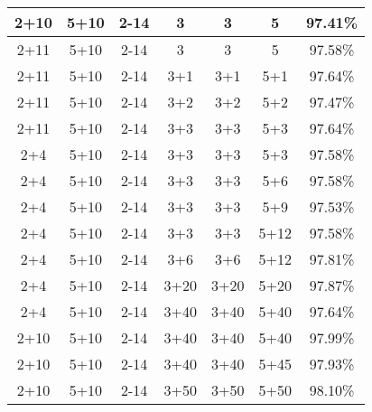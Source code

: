 \documentclass[12pt,a4paper]{extarticle}
\begin{document}
\begin{center}
\begin{tabular}{| c | c | c | c | c | c || c |}
  2+10 & 5+10 & 2-14 & 3 & 3 & 5 & 97.41\% \\ \hline
  2+11 & 5+10 & 2-14 & 3 & 3 & 5 & 97.58\% \\ \hline
  2+11 & 5+10 & 2-14 & 3+1 & 3+1 & 5+1 & 97.64\% \\ \hline
  2+11 & 5+10 & 2-14 & 3+2 & 3+2 & 5+2 & 97.47\% \\ \hline
  2+11 & 5+10 & 2-14 & 3+3 & 3+3 & 5+3 & 97.64\% \\ \hline
  2+4 & 5+10 & 2-14 & 3+3 & 3+3 & 5+3 & 97.58\% \\ \hline
  2+4 & 5+10 & 2-14 & 3+3 & 3+3 & 5+6 & 97.58\% \\ \hline
  2+4 & 5+10 & 2-14 & 3+3 & 3+3 & 5+9 & 97.53\% \\ \hline
  2+4 & 5+10 & 2-14 & 3+3 & 3+3 & 5+12 & 97.58\% \\ \hline
  2+4 & 5+10 & 2-14 & 3+6 & 3+6 & 5+12 & 97.81\% \\ \hline
  2+4 & 5+10 & 2-14 & 3+20 & 3+20 & 5+20 & 97.87\% \\ \hline
  2+4 & 5+10 & 2-14 & 3+40 & 3+40 & 5+40 & 97.64\% \\ \hline
  2+10 & 5+10 & 2-14 & 3+40 & 3+40 & 5+40 & 97.99\% \\ \hline
  2+10 & 5+10 & 2-14 & 3+40 & 3+40 & 5+45 & 97.93\% \\ \hline
  2+10 & 5+10 & 2-14 & 3+50 & 3+50 & 5+50 & 98.10\% \\ \hline
  \end{tabular}
\end{center}
\end{document}

